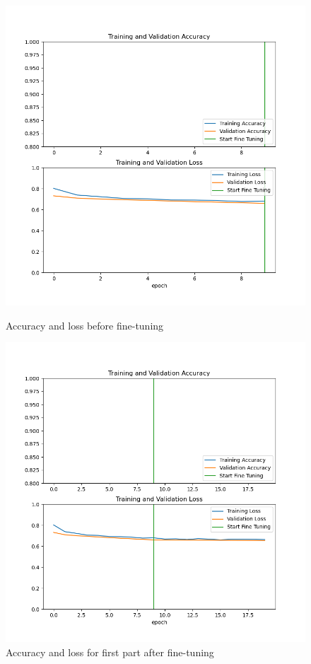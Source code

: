\documentclass[letterpaper]{article} %
\begin{document}
\begin{figure}[h!]
    \centering
    \begin{minipage}{0.2\textwidth}
        \centering
        \includegraphics[width=\textwidth]{vgg16_acc_loss_1.png}
        \caption{Accuracy and loss before fine-tuning}
        \label{fig:fig1}
    \end{minipage}
    \hfill
    \begin{minipage}{0.2\textwidth}
        \centering
        \includegraphics[width=\textwidth]{vgg16_acc_loss_2.png}
        \caption{Accuracy and loss for first part after fine-tuning}
        \label{fig:fig2}
    \end{minipage}
\end{figure}
\end{document}
